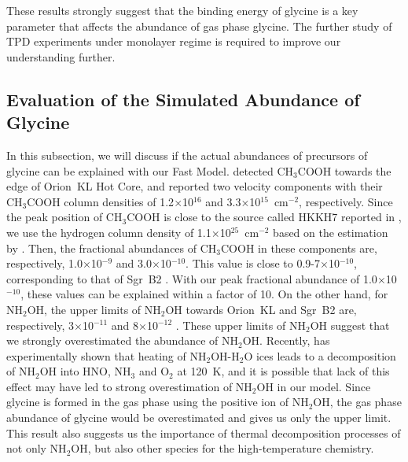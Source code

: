 \documentclass{aastex61}
\begin{document}
These results strongly suggest that the binding energy of glycine is a key parameter that affects the abundance of gas phase glycine.
%
The further study of TPD experiments under monolayer regime is required to improve our understanding further.




\subsection{Evaluation of the Simulated Abundance of Glycine}
%
In this subsection, we will discuss if the actual abundances of precursors of glycine can be explained with our Fast Model.
%
\cite{Favre17} detected CH$_3$COOH towards the edge of Orion~KL Hot Core, and reported two velocity components with their CH$_3$COOH column densities of 1.2$\times$10$^{16}$ and 3.3$\times$10$^{15}$~cm$^{-2}$, respectively.
%
Since the peak position of CH$_3$COOH is close to the source called HKKH7 reported in \cite{Hirota15}, we use the hydrogen column density of 1.1$\times$10$^{25}$~cm$^{-2}$ based on the estimation by \cite{Hirota15}.
%
Then, the fractional abundances of CH$_3$COOH in these components are, respectively, 1.0$\times$10$^{-9}$ and 3.0$\times$10$^{-10}$.
%
This value is close to 0.9-7$\times$10$^{-10}$, corresponding to that of Sgr~B2 \citep{Mehringer97}.
%
With our peak fractional abundance of 1.0$\times$10$^{-10}$, these values can be explained within a factor of 10.
%
On the other hand, for NH$_2$OH, the upper limits of NH$_2$OH towards Orion~KL and Sgr~B2 are, respectively, 3$\times$10$^{-11}$ and 8$\times$10$^{-12}$ \citep{Pulliam12}.
%
These upper limits of NH$_2$OH suggest that we strongly overestimated the abundance of NH$_2$OH.
% 
Recently, \cite{Jonusas16} has experimentally shown that heating of NH$_2$OH-H$_2$O ices leads to a decomposition of NH$_2$OH into HNO, NH$_3$ and O$_2$ at 120~K, and it is possible that lack of this effect may have led to strong overestimation of NH$_2$OH in our model.
%
Since glycine is formed in the gas phase using the positive ion of NH$_2$OH, the gas phase abundance of glycine would be overestimated and gives us only the upper limit.
%
This result also suggests us the importance of thermal decomposition processes of not only NH$_2$OH, but also other species for the high-temperature chemistry.
\end{document}
